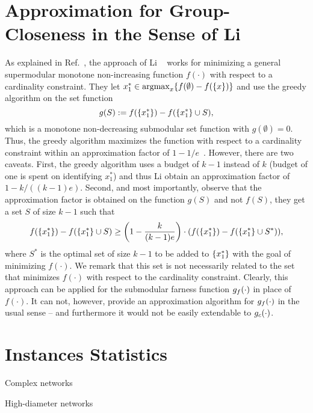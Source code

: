 
\section{Approximation for Group-Closeness in the Sense of Li \etal}
\label{apx:gh-gc:li-etal-apx}
%
As explained in Ref.~\cite[Appendix C]{DBLP:conf/alenex/AngrimanBDGGM21},
the approach of Li \etal~\cite{DBLP:conf/www/0002PSYZ19} works for
minimizing a general supermodular monotone non-increasing function
$f(\cdot)$ with respect to a cardinality constraint.
They let $x^*_1 \in \argmax_x\set{f(\emptyset) - f(\set{x})}$ and use
the greedy algorithm on the set function
%
\[
    g(S) := f(\set{x^*_1}) - f(\set{x^*_1} \cup S),
\]
%
which is a monotone non-decreasing submodular set function with
$g(\emptyset) = 0$. Thus, the greedy algorithm maximizes the function
with respect to a cardinality constraint within an approximation factor
of $1 - 1/e$~\cite{DBLP:journals/mp/NemhauserWF78}.
However, there are two caveats. First, the greedy algorithm uses a budget
of $k - 1$ instead of $k$ (budget of one is spent on identifying $x^*_1$)
and thus Li \etal obtain an approximation factor of $1 - k/((k - 1)e)$.
Second, and most importantly, observe that the approximation factor is
obtained on the function $g(S)$ and not $f(S)$, \ie they
get a set $S$ of size $k - 1$ such that
%
\[
f(\set{x^*_1}) - f(\set{x^*_1} \cup S) \ge
\roundb{1 - \frac{k}{(k - 1)e}}\cdot(f(\set{x^*_1}) - f(\set{x^*_1} \cup S^*)),
\]
%
where $S^*$ is the optimal set of size $k - 1$ to be added to $\set{x^*_1}$
with the goal of minimizing $f(\cdot)$.
We remark that this set is not necessarily related to the set that minimizes
$f(\cdot)$ with respect to the cardinality constraint. Clearly, this approach
can be applied for the submodular farness function $g_f(\cdot)$ in place
of $f(\cdot)$. It can not, however, provide an approximation algorithm
for $g_f(\cdot)$ in the usual sense -- and furthermore it would not be
easily extendable to $g_c(\cdot)$.
\vfill\pagebreak

\section{Instances Statistics}
\label{sec:gh-gc:inst-stats}
\setlength{\tabcolsep}{2pt}

\begin{table}[H]
\footnotesize\centering
{}
\label{tab:gh-gc-apx:small-inst-gh}
\begin{subtable}[t]{.45\textwidth}
\centering
\caption{Complex networks}
\label{tab:gh-gc-apx:small-inst-gh-cplx}

\end{subtable}\hfill
\begin{subtable}[t]{.45\textwidth}
\centering
\caption{High-diameter networks}
\label{tab:gh-gc-apx:small-inst-gh-high-diam}

\end{subtable}
\end{table}

